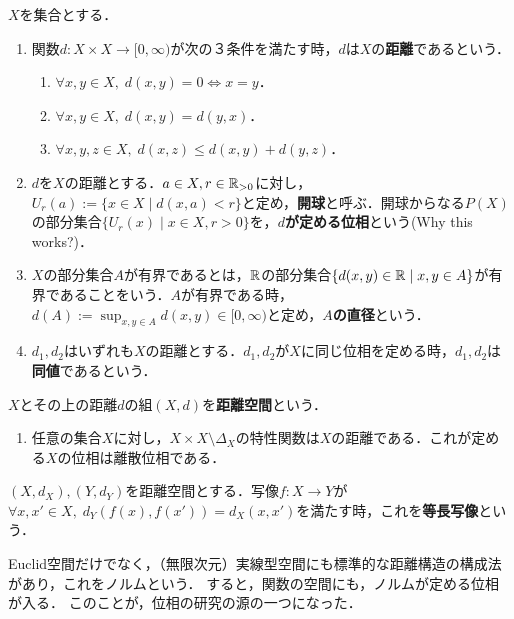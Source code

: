 \documentclass[uplatex, 12pt, dvipdfmx]{jsreport}
\begin{document}
\begin{definition}
    $X$を集合とする．
    \begin{enumerate}
        \item 関数$d:X\times X\to[0,\infty)$が次の３条件を満たす時，$d$は$X$の\textbf{距離}であるという．
        \begin{enumerate}[(1)]
            \item $\forall x,y\in X,\; d(x,y)=0\Leftrightarrow x=y$．
            \item $\forall x,y\in X,\; d(x,y)=d(y,x)$．
            \item $\forall x,y,z\in X,\; d(x,z)\le d(x,y)+d(y,z)$．
        \end{enumerate}
        \item $d$を$X$の距離とする．$a\in X,r\in\mathbb{R}_{>0}$に対し，$U_r(a):=\{x\in X\mid d(x,a)<r\}$と定め，\textbf{開球}と呼ぶ．開球からなる$P(X)$の部分集合$\{U_r(x)\mid x\in X,r>0\}$を，\textbf{$d$が定める位相}という(Why this works?)．
        \item $X$の部分集合$A$が有界であるとは，$\mathbb{R}$の部分集合$\{d(x,y)\in\mathbb{R}\mid x,y\in A\}$が有界であることをいう．$A$が有界である時，$d(A):=\sup_{x,y\in A}d(x,y)\in [0,\infty)$と定め，\textbf{$A$の直径}という．
        \item $d_1,d_2$はいずれも$X$の距離とする．$d_1,d_2$が$X$に同じ位相を定める時，$d_1,d_2$は\textbf{同値}であるという．
    \end{enumerate}
    $X$とその上の距離$d$の組$(X,d)$を\textbf{距離空間}という．
\end{definition}
\begin{example}\mbox{}
    \begin{enumerate}
        \item 任意の集合$X$に対し，$X\times X\setminus\Delta_X$の特性関数は$X$の距離である．これが定める$X$の位相は離散位相である．
    \end{enumerate}
\end{example}

\begin{definition}
    $(X,d_X),(Y,d_Y)$を距離空間とする．写像$f:X\to Y$が$\forall x,x'\in X,\; d_Y(f(x),f(x'))=d_X(x,x')$を満たす時，これを\textbf{等長写像}という．
\end{definition}

Euclid空間だけでなく，（無限次元）実線型空間にも標準的な距離構造の構成法があり，これをノルムという．
すると，関数の空間にも，ノルムが定める位相が入る．
このことが，位相の研究の源の一つになった．
\end{document}
